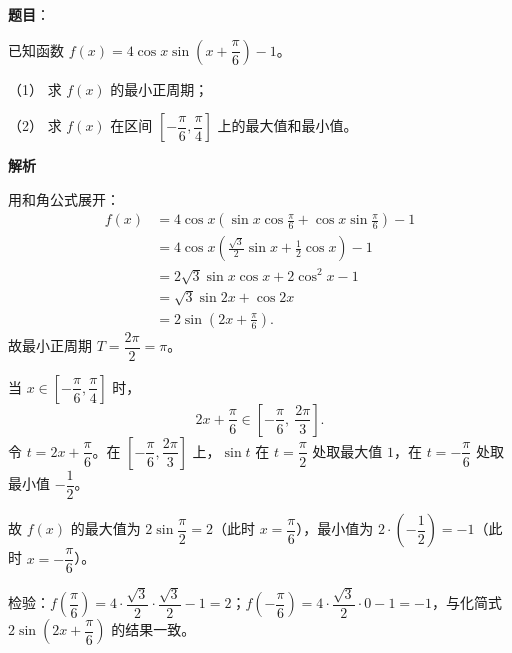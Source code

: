 \begin{answer}

\textbf{题目}：

已知函数 $f(x)=4\cos x\sin\left(x+\dfrac{\pi}{6}\right)-1$。

（1） 求 $f(x)$ 的最小正周期；

（2） 求 $f(x)$ 在区间 $\left[-\dfrac{\pi}{6},\dfrac{\pi}{4}\right]$ 上的最大值和最小值。

\textbf{解析}


用和角公式展开：
\nopagebreak[4]
\[
\begin{aligned}
f(x)&=4\cos x\left(\sin x\cos\frac{\pi}{6}+\cos x\sin\frac{\pi}{6}\right)-1\\
&=4\cos x\left(\frac{\sqrt3}{2}\sin x+\frac12\cos x\right)-1\\
&=2\sqrt3\sin x\cos x+2\cos^2x-1\\
&=\sqrt3\sin2x+\cos2x\\
&=2\sin\left(2x+\frac{\pi}{6}\right).
\end{aligned}
\]
故最小正周期 $T=\dfrac{2\pi}{2}=\pi$。


当 $x\in\left[-\dfrac{\pi}{6},\dfrac{\pi}{4}\right]$ 时，
\nopagebreak[4]
\[
2x+\frac{\pi}{6}\in\left[-\frac{\pi}{6},\ \frac{2\pi}{3}\right].
\]
令 $t=2x+\dfrac{\pi}{6}$。在 $\left[-\dfrac{\pi}{6},\dfrac{2\pi}{3}\right]$ 上，$\sin t$ 在 $t=\dfrac{\pi}{2}$ 处取最大值 $1$，在 $t=-\dfrac{\pi}{6}$ 处取最小值 $-\dfrac12$。

故 $f(x)$ 的最大值为 $2\sin\dfrac{\pi}{2}=2$（此时 $x=\dfrac{\pi}{6}$），最小值为 $2\cdot\left(-\dfrac12\right)=-1$（此时 $x=-\dfrac{\pi}{6}$）。

检验：$f\left(\dfrac{\pi}{6}\right)=4\cdot\dfrac{\sqrt3}{2}\cdot\dfrac{\sqrt3}{2}-1=2$；$f\left(-\dfrac{\pi}{6}\right)=4\cdot\dfrac{\sqrt3}{2}\cdot0-1=-1$，与化简式 $2\sin\left(2x+\dfrac{\pi}{6}\right)$ 的结果一致。



\end{answer}
